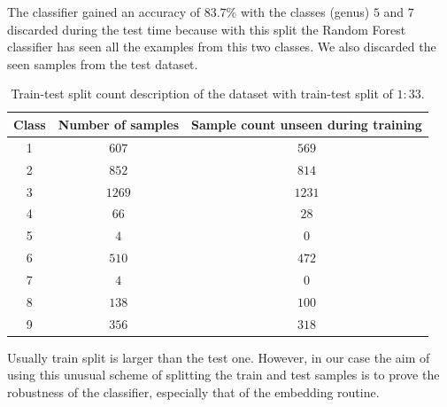 \documentclass[oneside, twocolumn, a4paper, 10pt]{IEEEtran}
\begin{document}
\par 
The classifier gained an accuracy of $83.7$\% with the classes (genus) $5$ and $7$ discarded during the test time because with this split the Random Forest classifier has seen all the examples from this two classes. We also discarded the seen samples from the test dataset.
\begin{table}
\begin{center}
\begin{tabular}{|c|c|c|}
\hline
Class & Number of samples & Sample count unseen during training\\ \hline
1 & $607$ & $569$\\ \hline
2 & $852$ & $814$\\ \hline
3 & $1269$ & $1231$\\ \hline
4 & $66$ & $28$\\ \hline
5 & $4$ & $0$\\ \hline
6 & $510$ & $472$\\ \hline
7 & $4$ & $0$\\ \hline
8 & $138$ & $100$\\ \hline
9 & $356$ & $318$\\ \hline
\end{tabular}
\caption{Train-test split count description of the dataset with train-test split of $1:33$.}
\label{tab:classseenunseen}
\end{center}
\end{table}
Usually train split is larger than the test one. However, in our case the aim of using this unusual scheme of splitting the train and test samples is to prove the robustness of the classifier, especially that of the embedding routine.\\
\end{document}
